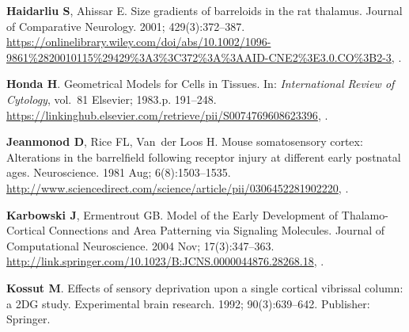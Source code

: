 \documentclass[9pt,lineno]{elife}
\begin{document}
\begin{thebibliography}{31}
\textbf{\color{eLifeMediumGrey} Haidarliu S}, Ahissar E.
\newblock Size gradients of barreloids in the rat thalamus.
\newblock Journal of Comparative Neurology.  2001; 429(3):372--387.
\newblock
  \urlprefix\url{https://onlinelibrary.wiley.com/doi/abs/10.1002/1096-9861%2820010115%29429%3A3%3C372%3A%3AAID-CNE2%3E3.0.CO%3B2-3},
  \href{10.1002/1096-9861(20010115)429:3<372::AID-CNE2>3.0.CO;2-3}{\doiprefix
  }.

\textbf{\color{eLifeMediumGrey} Honda H}.
\newblock Geometrical {Models} for {Cells} in {Tissues}.
\newblock In: \emph{International {Review} of {Cytology}}, vol.~81 Elsevier;
  1983.p. 191--248.
\newblock
  \urlprefix\url{https://linkinghub.elsevier.com/retrieve/pii/S0074769608623396},
  \href{10.1016/S0074-7696(08)62339-6}{\doiprefix
  }.

\textbf{\color{eLifeMediumGrey} Jeanmonod D}, Rice FL, Van~der Loos H.
\newblock Mouse somatosensory cortex: {Alterations} in the barrelfield
  following receptor injury at different early postnatal ages.
\newblock Neuroscience.  1981 Aug; 6(8):1503--1535.
\newblock
  \urlprefix\url{http://www.sciencedirect.com/science/article/pii/0306452281902220},
  \href{10.1016/0306-4522(81)90222-0}{\doiprefix
  }.

\textbf{\color{eLifeMediumGrey} Karbowski J}, Ermentrout GB.
\newblock Model of the {Early} {Development} of {Thalamo}-{Cortical}
  {Connections} and {Area} {Patterning} via {Signaling} {Molecules}.
\newblock Journal of Computational Neuroscience.  2004 Nov; 17(3):347--363.
\newblock
  \urlprefix\url{http://link.springer.com/10.1023/B:JCNS.0000044876.28268.18},
  \href{10.1023/B:JCNS.0000044876.28268.18}{\doiprefix
  }.

\textbf{\color{eLifeMediumGrey} Kossut M}.
\newblock Effects of sensory deprivation upon a single cortical vibrissal
  column: a {2DG} study.
\newblock Experimental brain research.  1992; 90(3):639--642.
\newblock Publisher: Springer.


\end{thebibliography}
\end{document}
